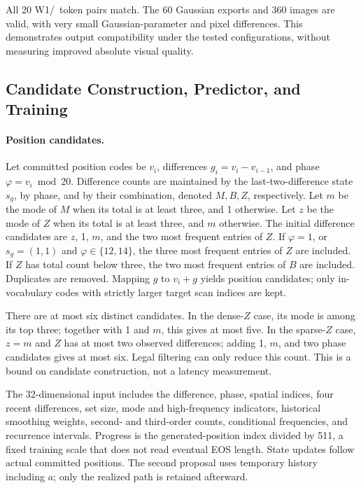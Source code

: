 All 20 W1/\PF\ token pairs match. The 60 Gaussian exports and 360 images are valid, with very small Gaussian-parameter and pixel differences. This demonstrates output compatibility under the tested configurations, without measuring improved absolute visual quality.

\subsection{Candidate Construction, Predictor, and Training}
\label{app:training}
\paragraph{Position candidates.}
Let committed position codes be $v_i$, differences $g_i=v_i-v_{i-1}$, and phase $\varphi=v_i\bmod20$. Difference counts are maintained by the last-two-difference state $s_g$, by phase, and by their combination, denoted $M,B,Z$, respectively. Let $m$ be the mode of $M$ when its total is at least three, and 1 otherwise. Let $z$ be the mode of $Z$ when its total is at least three, and $m$ otherwise. The initial difference candidates are $z$, 1, $m$, and the two most frequent entries of $Z$. If $\varphi=1$, or $s_g=(1,1)$ and $\varphi\in\{12,14\}$, the three most frequent entries of $Z$ are included. If $Z$ has total count below three, the two most frequent entries of $B$ are included. Duplicates are removed. Mapping $g$ to $v_i+g$ yields position candidates; only in-vocabulary codes with strictly larger target scan indices are kept.

There are at most six distinct candidates. In the dense-$Z$ case, its mode is among its top three; together with 1 and $m$, this gives at most five. In the sparse-$Z$ case, $z=m$ and $Z$ has at most two observed differences; adding 1, $m$, and two phase candidates gives at most six. Legal filtering can only reduce this count. This is a bound on candidate construction, not a latency measurement.

The 32-dimensional input includes the difference, phase, spatial indices, four recent differences, set size, mode and high-frequency indicators, historical smoothing weights, second- and third-order counts, conditional frequencies, and recurrence intervals. Progress is the generated-position index divided by 511, a fixed training scale that does not read eventual EOS length. State updates follow actual committed positions. The second proposal uses temporary history including $a$; only the realized path is retained afterward.

